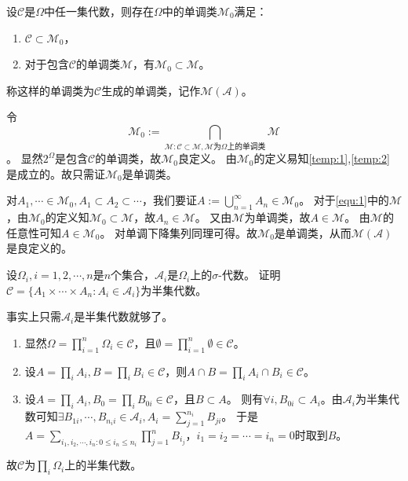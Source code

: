 \documentclass{ctexart}
\begin{document}
\begin{problem}\label{pro:1.4.6}
  设\(\mathcal{C} \)是\(\Omega \)中任一集代数，则存在\(\Omega \)中的单调类\(\mathcal{M}_0 \)满足：
  \begin{enumerate}
    \item \label{temp:1} \(\mathcal{C} \subset \mathcal{M}_0 \)，
    \item \label{temp:2}对于包含\(\mathcal{C} \)的单调类\(\mathcal{M} \)，有\(\mathcal{M}_0 \subset \mathcal{M} \)。
  \end{enumerate}
  称这样的单调类为\(\mathcal{C} \)生成的单调类，记作\(\mathcal{M}(\mathcal{A}) \)。
\end{problem}
\begin{solution}
  令
  \begin{equation}\label{equ:1}
    \mathcal{M}_0:=\bigcap_{\mathcal{M}:\mathcal{C} \subset \mathcal{M}, \mathcal{M} \text{为\(\Omega \)上的单调类}}\mathcal{M}
  \end{equation}
  。
  显然\(2^{\Omega} \)是包含\(\mathcal{C} \)的单调类，故\(\mathcal{M}_0 \)良定义。
  由\(\mathcal{M}_0 \)的定义易知\ref{temp:1},\ref{temp:2} 是成立的。故只需证\(\mathcal{M}_0 \)是单调类。

  对\(A_1,\cdots \in \mathcal{M}_0, A_1 \subset A_2 \subset \cdots\)，我们要证\(A:=\bigcup_{n=1}^{\infty} A_n \in \mathcal{M}_0 \)。
  对于\eqref{equ:1}中的\(\mathcal{M} \)，由\(\mathcal{M}_0 \)的定义知\(\mathcal{M}_0 \subset \mathcal{M} \)，故\(A_n \in \mathcal{M} \)。
  又由\(\mathcal{M} \)为单调类，故\(A \in \mathcal{M} \)。
  由\(\mathcal{M} \)的任意性可知\(A \in \mathcal{M}_0 \)。
  对单调下降集列同理可得。故\(\mathcal{M}_0 \)是单调类，从而\(\mathcal{M}(\mathcal{A}) \)是良定义的。
\end{solution}

\begin{problem}\label{pro:1.4.9}
  设\(\Omega_i ,i=1,2,\cdots,n\)是\(n \)个集合，\(\mathcal{A}_i \)是\(\Omega_i \)上的\(\sigma \)-代数。
  证明\(\mathcal{C}=\{A_1 \times \cdots \times A_n:A_i \in \mathcal{A}_i\} \)为半集代数。
\end{problem}
\begin{solution}
  事实上只需\(\mathcal{A}_i \)是半集代数就够了。
  \begin{enumerate}
    \item 显然\(\Omega=\prod_{i=1}^{n} \Omega_i \in \mathcal{C} \)，且\(\emptyset=\prod_{i=1}^{n} \emptyset  \in \mathcal{C}\)。
    \item 设\(A=\prod_{i}A_i,B=\prod_{i}B_i \in \mathcal{C} \)，则\(A \cap B=\prod_{i}A_i \cap B_i \in \mathcal{C} \)。
    \item 设\(A=\prod_{i}A_i,B_0=\prod_{i}B_{0i} \in \mathcal{C} \)，且\(B \subset A \)。
      则有\(\forall i,B_{0i} \subset A_i \)。由\(\mathcal{A}_i \)为半集代数可知\(\exists B_{1i},\cdots,B_{n_ii} \in \mathcal{A}_i,A_i=\sum_{j=1}^{n_i} B_{ji} \)。
      于是\(A=\sum_{i_1,i_2,\cdots,i_n:0 \leq i_n \leq n_i} \prod_{j=1}^{n} B_{i_j} \)，\(i_1=i_2=\cdots=i_n=0 \)时取到\(B \)。
  \end{enumerate}
  故\(\mathcal{C} \)为\(\prod_{i}\Omega_i \)上的半集代数。
\end{solution}
\end{document}
